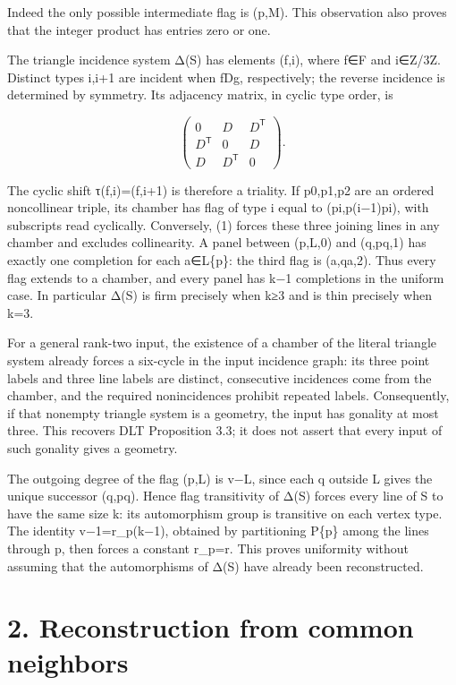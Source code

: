 Indeed the only possible intermediate flag is (p,M). This observation
also proves that the integer product has entries zero or one.

The triangle incidence system Δ(S) has elements (f,i), where f∈F and
i∈Z/3Z. Distinct types i,i+1 are incident when fDg, respectively; the
reverse incidence is determined by symmetry. Its adjacency matrix, in
cyclic type order, is

\[
 \begin{pmatrix}0&D&D^{\mathsf T}\\D^{\mathsf T}&0&D\\
 D&D^{\mathsf T}&0\end{pmatrix}.
\tag{3}
\]

The cyclic shift τ(f,i)=(f,i+1) is therefore a triality. If p0,p1,p2 are
an ordered noncollinear triple, its chamber has flag of type i equal to
(pi,p(i−1)pi), with subscripts read cyclically. Conversely, (1) forces
these three joining lines in any chamber and excludes collinearity. A
panel between (p,L,0) and (q,pq,1) has exactly one completion for each
a∈L\{p\}: the third flag is (a,qa,2). Thus every flag extends to a
chamber, and every panel has k−1 completions in the uniform case. In
particular Δ(S) is firm precisely when k≥3 and is thin precisely when
k=3.

For a general rank-two input, the existence of a chamber of the literal
triangle system already forces a six-cycle in the input incidence graph:
its three point labels and three line labels are distinct, consecutive
incidences come from the chamber, and the required nonincidences
prohibit repeated labels. Consequently, if that nonempty triangle system
is a geometry, the input has gonality at most three. This recovers DLT
Proposition 3.3; it does not assert that every input of such gonality
gives a geometry.

The outgoing degree of the flag (p,L) is v−\textbar L\textbar, since
each q outside L gives the unique successor (q,pq). Hence flag
transitivity of Δ(S) forces every line of S to have the same size k: its
automorphism group is transitive on each vertex type. The identity
v−1=r\_p(k−1), obtained by partitioning P\{p\} among the lines through
p, then forces a constant r\_p=r. This proves uniformity without
assuming that the automorphisms of Δ(S) have already been reconstructed.

\section{2. Reconstruction from common
neighbors}\label{reconstruction-from-common-neighbors}

